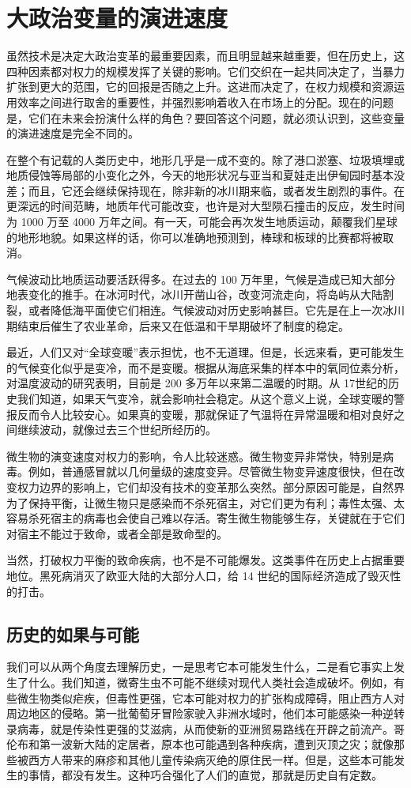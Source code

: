 \section{大政治变量的演进速度}
虽然技术是决定大政治变革的最重要因素，而且明显越来越重要，但在历史上，这四种因素都对权力的规模发挥了关键的影响。它们交织在一起共同决定了，当暴力扩张到更大的范围，它的回报是否随之上升。这进而决定了，在权力规模和资源运用效率之间进行取舍的重要性，并强烈影响着收入在市场上的分配。现在的问题是，它们在未来会扮演什么样的角色？要回答这个问题，就必须认识到，这些变量的演进速度是完全不同的。

在整个有记载的人类历史中，地形几乎是一成不变的。除了港口淤塞、垃圾填埋或地质侵蚀等局部的小变化之外，今天的地形状况与亚当和夏娃走出伊甸园时基本没差；而且，它还会继续保持现在，除非新的冰川期来临，或者发生剧烈的事件。在更深远的时间范畴，地质年代可能改变，也许是对大型陨石撞击的反应，发生时间为 1000 万至 4000 万年之间。有一天，可能会再次发生地质运动，颠覆我们星球的地形地貌。如果这样的话，你可以准确地预测到，棒球和板球的比赛都将被取消。

气候波动比地质运动要活跃得多。在过去的 100 万年里，气候是造成已知大部分地表变化的推手。在冰河时代，冰川开凿山谷，改变河流走向，将岛屿从大陆割裂，或者降低海平面使它们相连。气候波动对历史影响甚巨。它先是在上一次冰川期结束后催生了农业革命，后来又在低温和干旱期破坏了制度的稳定。

最近，人们又对“全球变暖”表示担忧，也不无道理。但是，长远来看，更可能发生的气候变化似乎是变冷，而不是变暖。根据从海底采集的样本中的氧同位素分析，对温度波动的研究表明，目前是 200 多万年以来第二温暖的时期。从 17世纪的历史我们知道，如果天气变冷，就会影响社会稳定。从这个意义上说，全球变暖的警报反而令人比较安心。如果真的变暖，那就保证了气温将在异常温暖和相对良好之间继续波动，就像过去三个世纪所经历的。

微生物的演变速度对权力的影响，令人比较迷惑。微生物变异非常快，特别是病毒。例如，普通感冒就以几何量级的速度变异。尽管微生物变异速度很快，但在改变权力边界的影响上，它们却没有技术的变革那么突然。部分原因可能是，自然界为了保持平衡，让微生物只是感染而不杀死宿主，对它们更为有利；毒性太强、太容易杀死宿主的病毒也会使自己难以存活。寄生微生物能够生存，关键就在于它们对宿主不能过于致命，或者全部是致命型的。

当然，打破权力平衡的致命疾病，也不是不可能爆发。这类事件在历史上占据重要地位。黑死病消灭了欧亚大陆的大部分人口，给 14 世纪的国际经济造成了毁灭性的打击。

\subsection{历史的如果与可能}
我们可以从两个角度去理解历史，一是思考它本可能发生什么，二是看它事实上发生了什么。我们知道，微寄生虫不可能不继续对现代人类社会造成破坏。例如，有些微生物类似疟疾，但毒性更强，它本可能对权力的扩张构成障碍，阻止西方人对周边地区的侵略。第一批葡萄牙冒险家驶入非洲水域时，他们本可能感染一种逆转录病毒，就是传染性更强的艾滋病，从而使新的亚洲贸易路线在开辟之前流产。哥伦布和第一波新大陆的定居者，原本也可能遇到各种疾病，遭到灭顶之灾；就像那些被西方人带来的麻疹和其他儿童传染病灭绝的原住民一样。但是，这些本可能发生的事情，都没有发生。这种巧合强化了人们的直觉，那就是历史自有定数。

